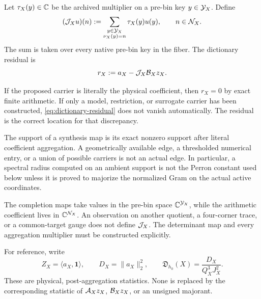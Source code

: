 \begin{definition}
\label{def:binning}
Let \(\tau_X(y)\in\mathbb C\) be the archived multiplier on a pre-bin key
\(y\in\mathcal Y_X\).  Define
\begin{equation}
 (\mathcal J_Xu)(n)
 :=
 \sum_{\substack{y\in\mathcal Y_X\\ \nu_X(y)=n}}
 \tau_X(y)u(y),
 \qquad n\in\mathcal N_X.
 \label{eq:literal-binning}
\end{equation}
The sum is taken over every native pre-bin key in the fiber.  The
dictionary residual is
\begin{equation}
 r_X:=a_X-\mathcal J_X\mathcal B_Xz_X.
 \label{eq:dictionary-residual}
\end{equation}
\end{definition}

If the proposed carrier is literally the physical coefficient, then
\(r_X=0\) by exact finite arithmetic.  If only a model, restriction,
or surrogate carrier has been constructed, \eqref{eq:dictionary-residual}
does not vanish automatically.  The residual is the correct location
for that discrepancy.

\begin{remark}
The support of a synthesis map is its exact nonzero support after
literal coefficient aggregation.  A geometrically available edge,
a thresholded numerical entry, or a union of possible carriers is not
an actual edge.  In particular, a spectral radius computed on an
ambient support is not the Perron constant used below unless it is
proved to majorize the normalized Gram on the actual active
coordinates.
\end{remark}

\begin{remark}
The completion maps take values in the pre-bin space
\(\mathbb C^{\mathcal Y_X}\), while the arithmetic coefficient lives in
\(\mathbb C^{\mathcal N_X}\).  An observation on another quotient, a four-corner
trace, or a common-target gauge does not define \(\mathcal J_X\).  The
determinant map and every aggregation multiplier must be constructed
explicitly.
\end{remark}

For reference, write
\begin{equation}
 Z_X=\langle a_X,\bm 1\rangle,
 \qquad
 D_X=\|a_X\|_2^2,
 \qquad
 \mathfrak D_{h_0}(X)=\frac{D_X}{Q_X^3J_X^2}.
 \label{eq:packet-statistics}
\end{equation}
These are physical, post-aggregation statistics.  None is replaced by
the corresponding statistic of \(\mathcal A_Xz_X\),
\(\mathcal B_Xz_X\), or an unsigned majorant.
